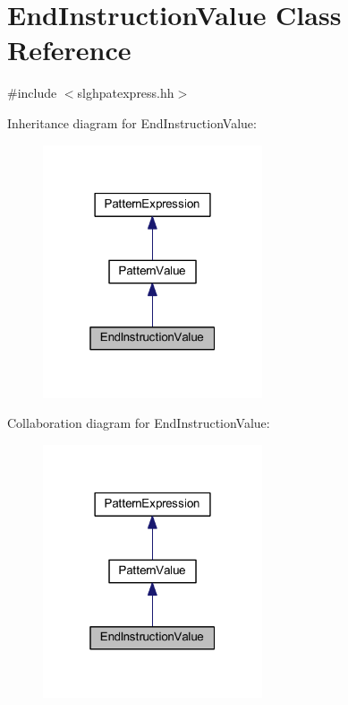 \hypertarget{class_end_instruction_value}{}\section{End\+Instruction\+Value Class Reference}
\label{class_end_instruction_value}


{\ttfamily \#include $<$slghpatexpress.\+hh$>$}



Inheritance diagram for End\+Instruction\+Value\+:
\nopagebreak
\begin{figure}[H]
\begin{center}
\leavevmode
\includegraphics[width=184pt]{class_end_instruction_value__inherit__graph}
\end{center}
\end{figure}


Collaboration diagram for End\+Instruction\+Value\+:
\nopagebreak
\begin{figure}[H]
\begin{center}
\leavevmode
\includegraphics[width=184pt]{class_end_instruction_value__coll__graph}
\end{center}
\end{figure}
